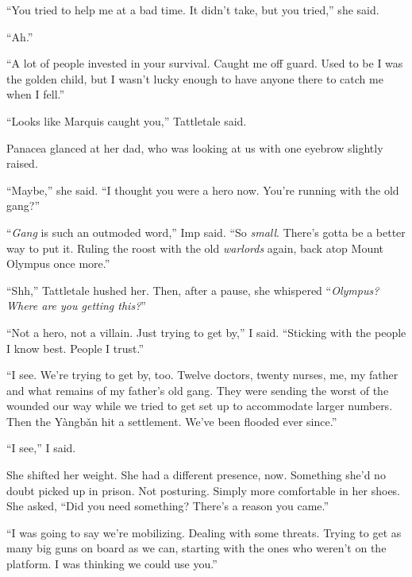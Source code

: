 ``You tried to help me at a bad time.  It didn't take, but you tried,'' she said.



``Ah.''



``A lot of people invested in your survival.  Caught me off guard.  Used to be I was the golden child, but I wasn't lucky enough to have anyone there to catch me when I fell.''



``Looks like Marquis caught you,'' Tattletale said.



Panacea glanced at her dad, who was looking at us with one eyebrow slightly raised.



``Maybe,'' she said.  ``I thought you were a hero now.  You're running with the old gang?''



``\emph{Gang} is such an outmoded word,'' Imp said.  ``So \emph{small}.  There's gotta be a better way to put it.  Ruling the roost with the old \emph{warlords} again, back atop Mount Olympus once more.''



``Shh,'' Tattletale hushed her.  Then, after a pause, she whispered ``\emph{Olympus?  Where are you getting this?}''



``Not a hero, not a villain.  Just trying to get by,'' I said.  ``Sticking with the people I know best.  People I trust.''



``I see.  We're trying to get by, too.  Twelve doctors, twenty nurses, me, my father and what remains of my father's old gang.  They were sending the worst of the wounded our way while we tried to get set up to accommodate larger numbers.  Then the Y\`{a}ngb\v{a}n hit a settlement.  We've been flooded ever since.''



``I see,'' I said.



She shifted her weight.  She had a different presence, now.  Something she'd no doubt picked up in prison.  Not posturing.  Simply more comfortable in her shoes.  She asked, ``Did you need something?  There's a reason you came.''



``I was going to say we're mobilizing.  Dealing with some threats.  Trying to get as many big guns on board as we can, starting with the ones who weren't on the platform.  I was thinking we could use you.''




